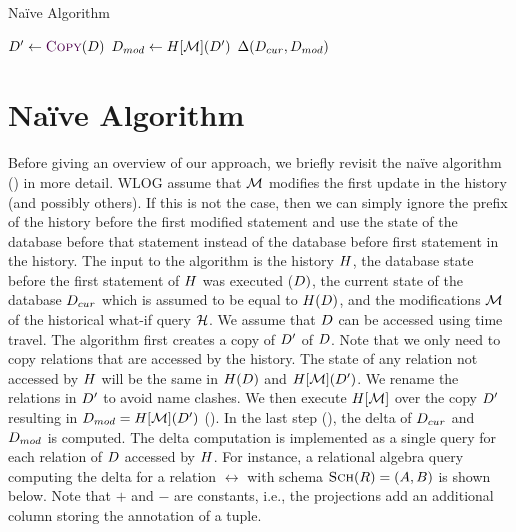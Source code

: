 \newcommand{\naivedbmod}{\db_{mod}}
\newcommand{\naivedbcur}{\db_{cur}}

\begin{algorithm}[t]
  \caption{Naïve \abbrHW Algorithm}
  \label{alg:naive-sol}
  \begin{algorithmic}[1]
    \Procedure{Naive-WhatIf}{$\history$, $\db$, $\naivedbcur$, $\deltaHist$}
    \State $\db' \gets \Call{Copy}{\db}$ \label{alg-line:naive-dbzero}
    \State $\naivedbmod \gets \history[\deltaHist](\db')$ \label{alg-line:naive-mod-history}
    \State \Return $\iDiff{\naivedbcur}{\naivedbmod}$ \label{alg-line:naive-sym-diff}
    \EndProcedure
  \end{algorithmic}
\end{algorithm}

\section{Naïve Algorithm}\label{sec:naive-solution}

Before giving an overview of our approach, we briefly revisit the naïve algorithm () in more detail. WLOG assume that $\deltaHist$ modifies the first update in the history (and possibly others). If this is not the case, then we can simply ignore the prefix of the history before the first modified statement and use the state of the database before that statement instead of the database before first statement in the history. The input to the algorithm is the history $\history$, the database state before the first statement of $\history$ was executed ($D)$, the current state of the database $\naivedbcur$ which is assumed to be equal to $H(D)$, and the modifications $\deltaHist$ of the historical what-if  query $\mathcal{H}$. We assume that $\db$ can be accessed using time travel.
% 
The algorithm first creates a copy of $D'$ of $\db$.  %
% 
Note that we only need to copy relations that are accessed by the history. The state of any relation not accessed by $\history$ will be the same in $H(D)$ and $H[\mathcal{M}](D')$.  We rename the relations in $D'$ to avoid name clashes.
We then execute $H[\mathcal{M}]$ over the copy $D'$  resulting in $\naivedbmod = \ahmod(\db')$ ().
In the last step (), the delta of $\naivedbcur$ and $\naivedbmod$ is computed. The delta computation is implemented as a single query for each relation of $\db$ accessed by $\history$. For instance, a relational algebra query computing the delta for a  relation $\rel$ with schema $\textsc{Sch}(R) = (A,B)$ is shown below. Note that $+$ and $-$ are constants, i.e., the projections add an additional column storing the annotation of a tuple.

